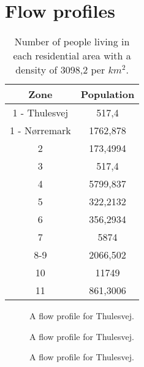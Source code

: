 \newpage
\section{Flow profiles}\label{app:flow_profiles}



\begin{table}[H]
\centering
\begin{tabular}{|c|c|}
\hline
\textbf{Zone} & \textbf{Population} \\ \hline
1 - Thulesvej & 517,4                \\ \hline
1 - Nørremark & 1762,878             \\ \hline
2             & 173,4994             \\ \hline
3             & 517,4                \\ \hline
4             & 5799,837             \\ \hline
5             & 322,2132             \\ \hline
6             & 356,2934             \\ \hline
7             & 5874                 \\ \hline
8-9           & 2066,502             \\ \hline
10            & 11749                \\ \hline
11            & 861,3006             \\ \hline
\end{tabular}
\caption{Number of people living in each residential area with a density of 3098,2 per $km^2$.}
\label{tab:population_in_the_residential_area}
\end{table}

\begin{figure}[H]
\centering

\caption{A flow profile for Thulesvej.}
\label{fig:flow_profile_thulevej}
\end{figure} 

\begin{figure}[H]
\centering

\caption{A flow profile for Thulesvej.}
\label{fig:flow_profile_thulevej}
\end{figure} 

\begin{figure}[H]
\centering

\caption{A flow profile for Thulesvej.}
\label{fig:flow_profile_thulevej}
\end{figure} 

